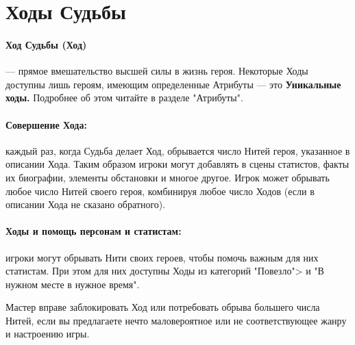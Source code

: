 \section{Ходы Судьбы}
\paragraph{Ход Судьбы (Ход)} — прямое вмешательство высшей силы в жизнь героя. Некоторые Ходы доступны лишь героям, имеющим определенные Атрибуты — это \textbf{Уникальные ходы.} Подробнее об этом читайте в разделе "Атрибуты".
\paragraph{Совершение Хода:} каждый раз, когда Судьба делает Ход, обрывается число Нитей героя, указанное в описании Хода. Таким образом игроки могут добавлять в сцены статистов, факты их биографии, элементы обстановки и многое другое. Игрок может обрывать любое число Нитей своего героя, комбинируя любое число Ходов (если в описании Хода не сказано обратного).
\paragraph{Ходы и помощь персонам и статистам:} игроки могут обрывать Нити своих героев, чтобы помочь важным для них статистам. При этом для них доступны Ходы из категорий "Повезло"> и "В нужном месте в нужное время".
\begin{tcolorbox}
Мастер вправе заблокировать Ход или потребовать обрыва большего числа Нитей, если вы предлагаете нечто маловероятное или не соответствующее жанру и настроению игры.
\end{tcolorbox}
